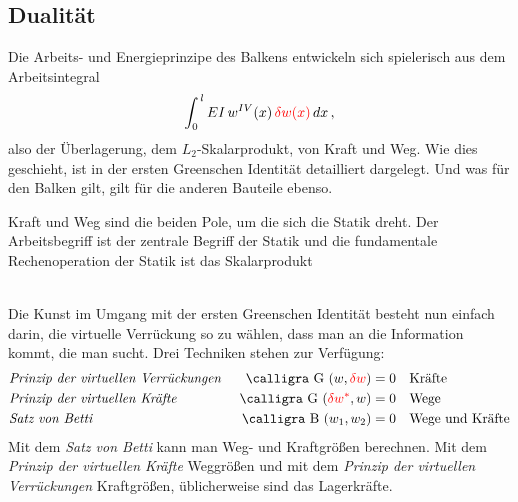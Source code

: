 {{{{%
{\textcolor{sectionTitleBlue}{\section{Dualit\"{a}t}}}
Die Arbeits- und Energieprinzipe des Balkens entwickeln sich spielerisch aus dem Arbeitsintegral
\begin{align}
\int_0^{\,l} EI\,w^{IV}(x) \,\textcolor{red}{\delta w(x)}\,dx\,,
\end{align}
also der \"{U}berlagerung, dem $L_2$-Skalarprodukt, von Kraft und Weg. Wie dies geschieht, ist in der ersten Greenschen Identit\"{a}t detailliert dargelegt. Und was f\"{u}r den Balken gilt, gilt f\"{u}r die anderen Bauteile ebenso.\\

\hspace*{-12pt}\colorbox{highlightBlue}{\parbox{0.98\textwidth}{ Kraft und Weg sind die beiden Pole, um die sich die Statik dreht. Der Arbeitsbegriff ist der zentrale Begriff der Statik und die fundamentale Rechenoperation der Statik ist das Skalarprodukt}}\\

Die Kunst im Umgang mit der ersten Greenschen Identit\"{a}t besteht nun einfach darin, die virtuelle Verr\"{u}ckung so zu w\"{a}hlen, dass man an die Information kommt, die man sucht. Drei Techniken stehen zur Verf\"{u}gung:
\begin{align}
&\text{{\em Prinzip der virtuellen Verr\"{u}ckungen\/}} \quad &\!\!\!\!\text{\normalfont\calligra G\,\,}(w, \textcolor{red}{\delta w}) = 0 \quad &\text{Kr\"{a}fte}\nn \\
&\text{{\em Prinzip der virtuellen Kr\"{a}fte\/}} \quad &\!\!\!\!\text{\normalfont\calligra G\,\,}(\textcolor{red}{\delta w^*}, w) = 0 \quad &\text{Wege}\nn \\
&\text{{\em Satz von Betti\/}} \quad &\!\!\!\!\text{\normalfont\calligra B\,\,}(w_1, w_2) = 0\quad &\text{Wege und Kr\"{a}fte}\nn
\end{align}
Mit dem {\em Satz von Betti\/} kann man Weg- und Kraftgr\"{o}{\ss}en berechnen. Mit dem {\em Prinzip der virtuellen Kr\"{a}fte\/} Weggr\"{o}{\ss}en und mit dem {\em Prinzip der virtuellen Verr\"{u}ckungen\/} Kraftgr\"{o}{\ss}en, \"{u}blicherweise sind das Lagerkr\"{a}fte.

}}}}
